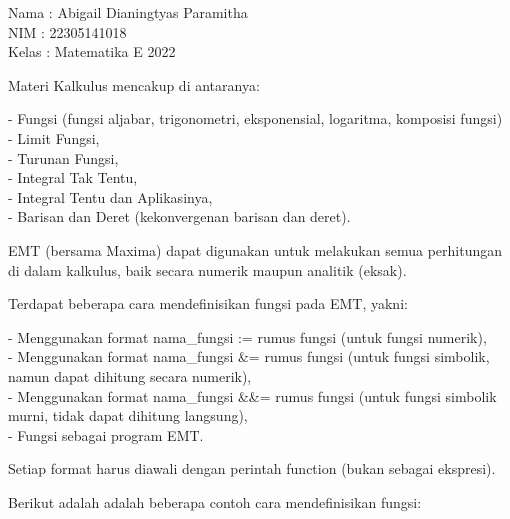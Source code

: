 \documentclass[a4paper,10pt]{article}
\begin{document}
\begin{eulernotebook}
\begin{eulercomment}
Nama : Abigail Dianingtyas Paramitha\\
NIM : 22305141018\\
Kelas : Matematika E 2022\\
\begin{eulercomment}
\eulerheading{}
\begin{eulercomment}
\begin{eulercomment}
\begin{eulercomment}
Materi Kalkulus mencakup di antaranya:

- Fungsi (fungsi aljabar, trigonometri, eksponensial, logaritma,
komposisi fungsi)\\
- Limit Fungsi,\\
- Turunan Fungsi,\\
- Integral Tak Tentu,\\
- Integral Tentu dan Aplikasinya,\\
- Barisan dan Deret (kekonvergenan barisan dan deret).

EMT (bersama Maxima) dapat digunakan untuk melakukan semua perhitungan
di dalam kalkulus, baik secara numerik maupun analitik (eksak).

\end{eulercomment}
\begin{eulercomment}
Terdapat beberapa cara mendefinisikan fungsi pada EMT, yakni:

- Menggunakan format nama\_fungsi := rumus fungsi (untuk fungsi
numerik),\\
- Menggunakan format nama\_fungsi \&= rumus fungsi (untuk fungsi
simbolik, namun dapat dihitung secara numerik),\\
- Menggunakan format nama\_fungsi \&\&= rumus fungsi (untuk fungsi
simbolik murni, tidak dapat dihitung langsung),\\
- Fungsi sebagai program EMT.

Setiap format harus diawali dengan perintah function (bukan sebagai
ekspresi).

Berikut adalah adalah beberapa contoh cara mendefinisikan fungsi:


\end{eulercomment}
\end{eulercomment}
\end{eulercomment}
\end{eulercomment}
\end{eulercomment}
\end{eulernotebook}
\end{document}
